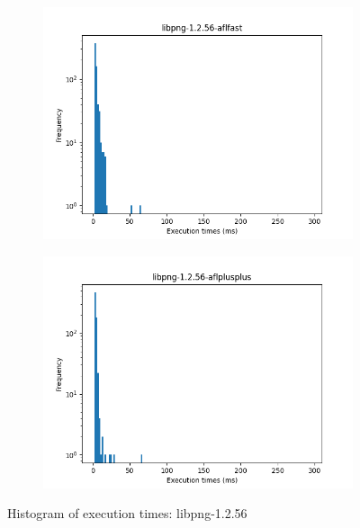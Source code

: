 \begin{figure}
\begin{subfigure}[t]{0.475\textwidth}
        \centering
        \includegraphics[width=\textwidth]{Experiments/execs/libpng-1.2.56-aflfast.png}
        \caption{}
        \label{fig:sub:libpng-hist-aflfast}
    \end{subfigure}
    \hfill
    \begin{subfigure}[t]{0.475\textwidth}
        \centering
        \includegraphics[width=\textwidth]{Experiments/execs/libpng-1.2.56-aflplusplus.png}
        \caption{}
        \label{fig:sub:libpng-hist-aflplusplus}
    \end{subfigure}

    \caption{Histogram of execution times: libpng-1.2.56}
    \label{fig:exe-libpng}
\end{figure}

